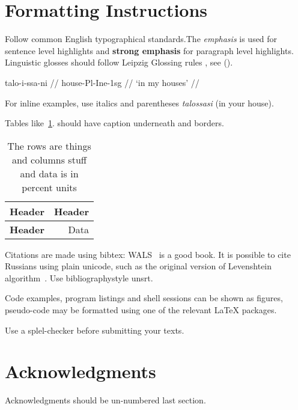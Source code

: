\documentclass[b5paper]{article}
\begin{document}
\section{Formatting Instructions}

Follow common English typographical standards.The \emph{emphasis} is used for
sentence level highlights and \textbf{strong emphasis} for paragraph level
highlights. Linguistic glosses should follow Leipzig Glossing rules
\url{}, see (\nextx).

\ex
\begingl
\gla talo-i-ssa-ni //
\glb house-{\sc Pl}-{\sc Ine}-{\sc 1sg} //
\glft `in my houses' //
\endgl
\xe

For inline examples, use italics and parentheses \emph{talossasi} (in your
house).

Tables like~\ref{table:example}. should have caption underneath and borders.

\begin{table}
    \center
    \begin{tabular}{|l|r|}
        \hline
        \bf Header & \bf Header \\
        \hline
        \bf Header & Data \\
        \hline
    \end{tabular}
    \caption{The rows are things and columns stuff and data is in percent units
    \label{table:example}}
\end{table}

Citations are made using bibtex: WALS~\cite{haspelmath2005world} is a good book.
It is possible to cite Russians using plain unicode, such as the original 
version of Levenshtein algorithm~\cite{levenshtein1965}.
Use bibliographystyle unsrt.

Code examples, program listings and shell sessions can be shown as figures,
pseudo-code may be formatted using one of the relevant \LaTeX{} packages.

Use a splel-checker before submitting your texts.

\section*{Acknowledgments}

Acknowledgments should be un-numbered last section.



\end{document}
